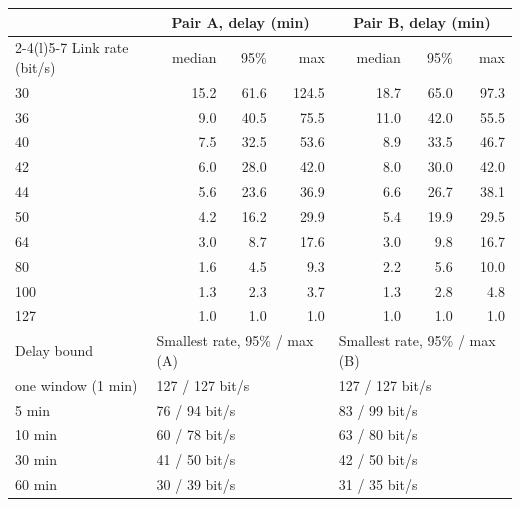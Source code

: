 \begin{tabular}{@{}l rrr rrr@{}}
\toprule
& \multicolumn{3}{c}{Pair A, delay (min)} & \multicolumn{3}{c}{Pair B, delay (min)} \\
\cmidrule(lr){2-4}\cmidrule(l){5-7}
Link rate (bit/s) & median & 95\% & max & median & 95\% & max \\
\midrule
30 & 15.2 & 61.6 & 124.5 & 18.7 & 65.0 & 97.3 \\
36 & 9.0 & 40.5 & 75.5 & 11.0 & 42.0 & 55.5 \\
40 & 7.5 & 32.5 & 53.6 & 8.9 & 33.5 & 46.7 \\
42 & 6.0 & 28.0 & 42.0 & 8.0 & 30.0 & 42.0 \\
44 & 5.6 & 23.6 & 36.9 & 6.6 & 26.7 & 38.1 \\
50 & 4.2 & 16.2 & 29.9 & 5.4 & 19.9 & 29.5 \\
64 & 3.0 & 8.7 & 17.6 & 3.0 & 9.8 & 16.7 \\
80 & 1.6 & 4.5 & 9.3 & 2.2 & 5.6 & 10.0 \\
100 & 1.3 & 2.3 & 3.7 & 1.3 & 2.8 & 4.8 \\
127 & 1.0 & 1.0 & 1.0 & 1.0 & 1.0 & 1.0 \\
\midrule
Delay bound & \multicolumn{3}{l}{Smallest rate, 95\% / max (A)} & \multicolumn{3}{l}{Smallest rate, 95\% / max (B)} \\
\midrule
one window (1 min) & \multicolumn{3}{l}{127 / 127 bit/s} & \multicolumn{3}{l}{127 / 127 bit/s} \\
5 min & \multicolumn{3}{l}{76 / 94 bit/s} & \multicolumn{3}{l}{83 / 99 bit/s} \\
10 min & \multicolumn{3}{l}{60 / 78 bit/s} & \multicolumn{3}{l}{63 / 80 bit/s} \\
30 min & \multicolumn{3}{l}{41 / 50 bit/s} & \multicolumn{3}{l}{42 / 50 bit/s} \\
60 min & \multicolumn{3}{l}{30 / 39 bit/s} & \multicolumn{3}{l}{31 / 35 bit/s} \\
\bottomrule
\end{tabular}
